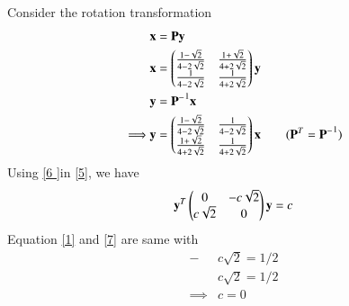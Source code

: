 \documentclass[journal,12pt,twocolumn]{IEEEtran}
\begin{document}
Consider the rotation transformation
\begin{align}
	& \mathbf{x} = \mathbf{P}\mathbf{y} \\
	& \mathbf{x} = \begin{pmatrix}\frac{1-\sqrt{2}}{4-2\sqrt{2}} & \frac{1+\sqrt{2}}{4+2\sqrt{2}} \\ \frac{1}{4-2\sqrt{2}} & \frac{1}{4+2\sqrt{2}}\end{pmatrix}\mathbf{y} \\
	& \mathbf{y} = \mathbf{P^-}^1\mathbf{x} \\
\implies & \mathbf{y} =\begin{pmatrix}\frac{1-\sqrt{2}}{4-2\sqrt{2}} & \frac{1}{4-2\sqrt{2}} \\ \frac{1+\sqrt{2}}{4+2\sqrt{2}}  & \frac{1}{4+2\sqrt{2}}\end{pmatrix} \mathbf{x} \qquad (\mathbf{P}^T = \mathbf{P^-}^1) \label{6 }
\end{align}
Using \eqref{6 }in \eqref{5}, we have
\begin{align}
	\mathbf{y}^T\begin{pmatrix}0 & -c\sqrt{2} \\ c\sqrt{2} & 0\end{pmatrix}\mathbf{y} = c \label{7}
\end{align}
Equation \eqref{1} and \eqref{7} are same with 
\begin{align}
-& c\sqrt{2} = 1/2 \\
&  c\sqrt{2} = 1/2 \\
\implies & c= 0
\end{align}
\end{document}
